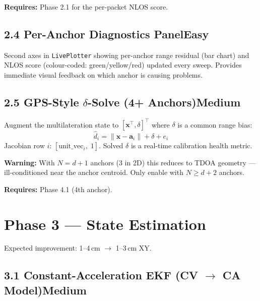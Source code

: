 \documentclass[11pt,a4paper]{article}
\newcommand{\vect}[1]{\mathbf{#1}}
\newcommand{\dif}[1]{\texorpdfstring{\hfill#1}{}}
\newcommand{\easy}{\textcolor{dkgreen}{\textbf{Easy}}}
\newcommand{\medium}{\textcolor{dkorange}{\textbf{Medium}}}
\begin{document}
\textbf{Requires:} Phase 2.1 for the per-packet NLOS score.

\subsection{2.4 Per-Anchor Diagnostics Panel\dif{\easy}}

Second axes in \texttt{LivePlotter} showing per-anchor range residual (bar chart) and NLOS score (colour-coded: green/yellow/red) updated every sweep. Provides immediate visual feedback on which anchor is causing problems.

\subsection{\texorpdfstring{2.5 GPS-Style $\delta$-Solve (4+ Anchors)\dif{\medium}}{2.5 GPS-Style delta-Solve (4+ Anchors)}}

Augment the multilateration state to $[\vect{x}^\top, \delta]^\top$ where $\delta$ is a common range bias:
\[
\hat{d}_i = \|\vect{x} - \vect{a}_i\| + \delta + e_i
\]
Jacobian row $i$: $[\text{unit\_vec}_i,\; 1]$. Solved $\delta$ is a real-time calibration health metric.

\begin{warnbox}
\textbf{Warning:} With $N = d+1$ anchors (3 in 2D) this reduces to TDOA geometry --- ill-conditioned near the anchor centroid. Only enable with $N \geq d+2$ anchors.
\end{warnbox}

\textbf{Requires:} Phase 4.1 (4th anchor).

\section{Phase 3 --- State Estimation}

\begin{phasebox}
Expected improvement: 1--4\,cm $\to$ 1--3\,cm XY.
\end{phasebox}

\subsection{\texorpdfstring{3.1 Constant-Acceleration EKF (CV $\to$ CA Model)\dif{\medium}}{3.1 Constant-Acceleration EKF (CV to CA Model)}}
\end{document}
